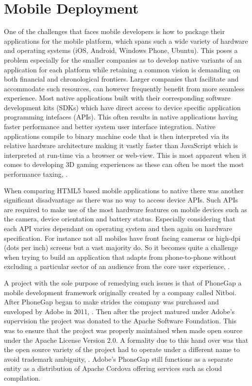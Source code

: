 \documentclass[final]{cmpreport}
\begin{document}
{\section{Mobile Deployment}
One of the challenges that faces mobile developers is how to package their applications for the mobile platform, which spans such a wide variety of hardware and operating systems (iOS\footnotemark[29], Android\footnotemark[30], Windows Phone\footnotemark[31], Ubuntu\footnotemark[32]). This poses a problem especially for the smaller companies as to develop native variants of an application for each platform while retaining a common vision is demanding on both financial and chronological frontiers. Larger companies that facilitate and accommodate such resources, can however frequently benefit from more seamless experience. Most native applications built with their corresponding software development kits (SDKs) which have direct access to device specific application programming intefaces (APIs). This often results in native applications having faster performance and better system user interface integration. Native applications compile to binary machine code that is then interpreted via its relative hardware architecture making it vastly faster than JavaScript which is interpreted at run-time via a browser or web-view. This is most apparent when it comes to developing 3D gaming experiences as these can often be most the most performance taxing, \cite{Kulloli}.


When comparing HTML5 based mobile applications to native there was another significant disadvantage as there was no way to access device APIs. Such APIs are required to make use of the most hardware features on mobile devices such as the camera, device orientation and battery status. Especially considering that each API varies dependant on operating system and then again on hardware specification. For instance not all mobiles have front facing cameras or high-dpi (dots per inch) screens but a vast majority do. So it becomes quite a challenge when trying to build an application that adapts from phone-to-phone without excluding a particular sector of an audience from the core user experience, \cite{Charland}.

A project with the sole purpose of remedying such issues is that of PhoneGap a mobile development framework originally created by a company called Nitboi. After PhoneGap began to make strides the company was purchased and enveloped by Adobe in 2011, \cite{Adobe}. Then after the project matured under Adobe's supervision the project was donated to the Apache Software Foundation. This was to ensure that the project was properly maintained when made open source under the Apache License Version 2.0\footnotemark[33]. A formality due to this hand over was that the open source variety of the project had to operate under a different name to avoid trademark ambiguity, \cite{Leroux}. Adobe's PhoneGap still functions as a separate entity as a distribution of Apache Cordova offering services such as cloud compilation\footnotemark[34].

}
\end{document}
